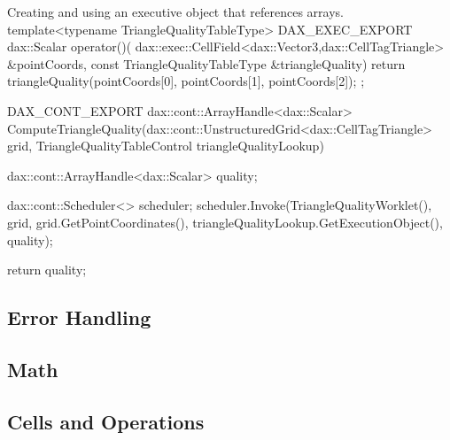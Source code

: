 \begin{daxexample}{Creating and using an executive object that references arrays.}
{  template<typename TriangleQualityTableType>
  DAX_EXEC_EXPORT
  dax::Scalar operator()(
      dax::exec::CellField<dax::Vector3,dax::CellTagTriangle> &pointCoords,
      const TriangleQualityTableType &triangleQuality)
  {
    return triangleQuality(pointCoords[0], pointCoords[1], pointCoords[2]);
  }
};

DAX_CONT_EXPORT
dax::cont::ArrayHandle<dax::Scalar>
ComputeTriangleQuality(dax::cont::UnstructuredGrid<dax::CellTagTriangle> grid,
                       TriangleQualityTableControl triangleQualityLookup)
{
  dax::cont::ArrayHandle<dax::Scalar> quality;

  dax::cont::Scheduler<> scheduler;
  scheduler.Invoke(TriangleQualityWorklet(),
                   grid,
                   grid.GetPointCoordinates(),
                   triangleQualityLookup.GetExecutionObject(),
                   quality);

  return quality;
}
\end{daxexample}



\subsection{Error Handling}
\label{sec:ErrorHandlingExecution}




\subsection{Math}
\label{sec:Math}




\subsection{Cells and Operations}
\label{sec:CellsAndOperations}

 \\
 \\
 \\



